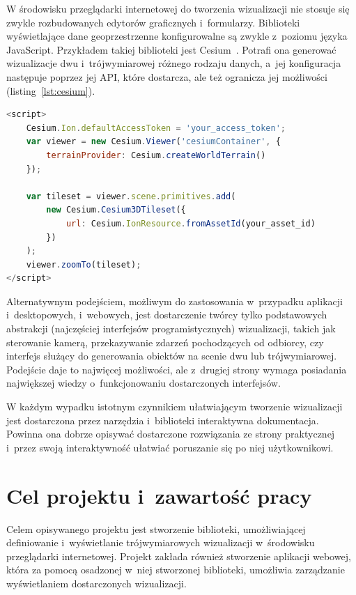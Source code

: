 W środowisku przeglądarki internetowej do tworzenia wizualizacji nie stosuje się zwykle rozbudowanych edytorów graficznych i~formularzy. Biblioteki wyświetlające dane geoprzestrzenne konfigurowalne są zwykle z~poziomu języka JavaScript. Przykładem takiej biblioteki jest \mbox{Cesium~\cite{CesiumJS}}. Potrafi ona generować wizualizacje dwu i~trójwymiarowej różnego rodzaju danych, a~jej konfiguracja następuje poprzez jej API, które dostarcza, ale też ogranicza jej możliwości (listing~\ref{lst:cesium}).

\begin{lstlisting}[label={lst:cesium}, language=javascript, caption={Konfiguracja podstawowej wizualizacji w~bibliotece Cesium. Żródło~\cite{CesiumJSExample}.}]
<script>
    Cesium.Ion.defaultAccessToken = 'your_access_token';
    var viewer = new Cesium.Viewer('cesiumContainer', {
        terrainProvider: Cesium.createWorldTerrain()
    });

    var tileset = viewer.scene.primitives.add(
        new Cesium.Cesium3DTileset({
            url: Cesium.IonResource.fromAssetId(your_asset_id)
        })
    );
    viewer.zoomTo(tileset);
</script>
\end{lstlisting}

Alternatywnym podejściem, możliwym do zastosowania w~przypadku aplikacji i~desktopowych, i~webowych, jest dostarczenie twórcy tylko podstawowych abstrakcji (najczęściej interfejsów programistycznych) wizualizacji, takich jak sterowanie kamerą, przekazywanie zdarzeń pochodzących od odbiorcy, czy interfejs służący do generowania obiektów na scenie dwu lub trójwymiarowej. Podejście daje to najwięcej możliwości, ale z~drugiej strony wymaga posiadania największej wiedzy o~funkcjonowaniu dostarczonych interfejsów.

W każdym wypadku istotnym czynnikiem ułatwiającym tworzenie wizualizacji jest dostarczona przez narzędzia i~biblioteki interaktywna dokumentacja. Powinna ona dobrze opisywać dostarczone rozwiązania ze strony praktycznej i~przez swoją interaktywność ułatwiać poruszanie się po niej użytkownikowi. 

\section{Cel projektu i~zawartość pracy}

Celem opisywanego projektu jest stworzenie biblioteki, umożliwiającej definiowanie i~wyświetlanie trójwymiarowych wizualizacji w~środowisku przeglądarki internetowej. Projekt zakłada również stworzenie aplikacji webowej, która za pomocą osadzonej w~niej stworzonej biblioteki, umożliwia zarządzanie wyświetlaniem dostarczonych wizualizacji.

